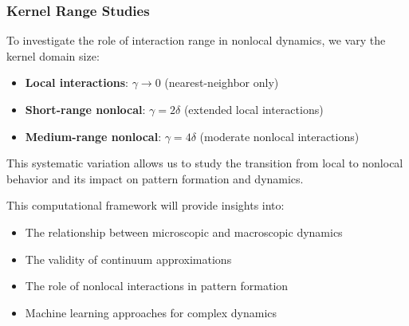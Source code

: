 \documentclass[11pt,a4paper]{article}
\begin{document}
\subsubsection{Kernel Range Studies}

To investigate the role of interaction range in nonlocal dynamics, we vary the kernel domain size:

\begin{itemize}
    \item \textbf{Local interactions}: $\gamma \to 0$ (nearest-neighbor only)
    \item \textbf{Short-range nonlocal}: $\gamma = 2\delta$ (extended local interactions)
    \item \textbf{Medium-range nonlocal}: $\gamma = 4\delta$ (moderate nonlocal interactions)
\end{itemize}

This systematic variation allows us to study the transition from local to nonlocal behavior and its impact on pattern formation and dynamics.

This computational framework will provide insights into:

\begin{itemize}
    \item The relationship between microscopic and macroscopic dynamics
    \item The validity of continuum approximations
    \item The role of nonlocal interactions in pattern formation
    \item Machine learning approaches for complex dynamics
\end{itemize}
\end{document}
